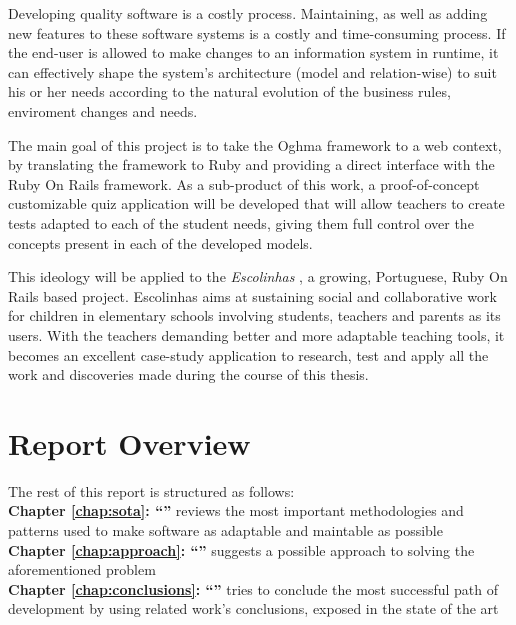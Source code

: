 Developing quality software is a costly process. Maintaining, as well as adding new features to these software systems is a costly and time-consuming process. If the end-user is allowed to make changes to an information system in runtime, it can effectively shape the system's architecture (model and relation-wise) to suit his or her needs according to the natural evolution of the business rules, enviroment changes and needs.

The main goal of this project is to take the Oghma \cite{FCA09} framework to a web context, by translating the framework to Ruby and providing a direct interface with the Ruby On Rails framework. As a sub-product of this work, a proof-of-concept customizable quiz application will be developed that will allow teachers to create tests adapted to each of the student needs, giving them full control over the concepts present in each of the developed models.

This ideology will be applied to the \textit{Escolinhas} \cite{escolinhas}, a growing, Portuguese, Ruby On Rails based project. Escolinhas aims at sustaining social and collaborative work for children in elementary schools involving students, teachers and parents as its users. With the teachers demanding better and more adaptable teaching tools, it becomes an excellent case-study application to research, test and apply all the work and discoveries made during the course of this thesis.

\section{Report Overview}\label{sec:structure}

The rest of this report is structured as follows:\\

\textbf{Chapter \ref{chap:sota}: ``'' } reviews the most important methodologies and patterns used to make software as adaptable and maintable as possible\\

\textbf{Chapter \ref{chap:approach}: ``'' } suggests a possible approach to solving the aforementioned problem\\

\textbf{Chapter \ref{chap:conclusions}: ``'' } tries to conclude the most successful path of development by using related work’s conclusions, exposed in the state of the art %

